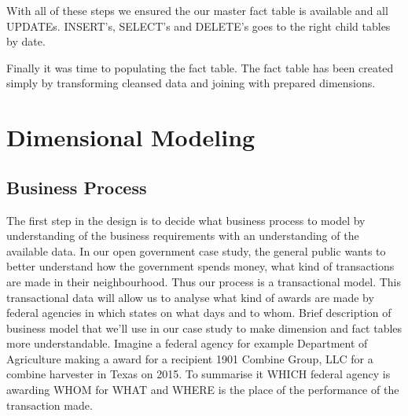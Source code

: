 \documentclass[letterpaper,12pt,oneside]{sphinxmanual}
\begin{document}
With all of these steps we ensured the our master fact table is available and all UPDATEs. INSERT’s, SELECT’s and DELETE’s goes to the right child tables by date.

Finally it was time to populating the fact table. The fact table has been created simply by transforming cleansed data and joining with prepared dimensions.


\section{Dimensional Modeling}
\label{datawarehouse:dimensional-modeling}

\subsection{Business Process}
\label{datawarehouse:business-process}
The first step in the design is to decide what business process to model by understanding of
the business requirements with an understanding of the available data. In our open government case study,
the general public wants to better understand how the government spends money, what kind of transactions are
made in their neighbourhood. Thus our process is a transactional model. This transactional data will allow us
to analyse what kind of awards are made by federal agencies in which states on what days and to whom.
Brief description of business model that we’ll use in our case study to make dimension and fact tables
more understandable. Imagine a federal agency for example Department of Agriculture making a award for a
recipient 1901 Combine Group, LLC for a combine harvester in Texas on 2015. To summarise it WHICH federal
agency is awarding WHOM for WHAT and WHERE is the place of the performance of the transaction made.
\end{document}
